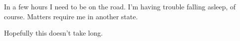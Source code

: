 In a few hours I need to be on the road.  I'm having trouble falling asleep, of course.  Matters require me in another state.

Hopefully this doesn't take long.

